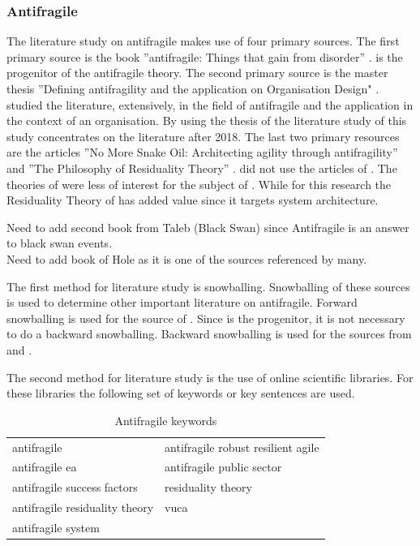 \subsubsection{Antifragile}
\label{subsub:antifragile}
The literature study on \gls{antifragile} makes use of four primary sources. The first primary source is the book ''\Gls{antifragile}: Things that gain from disorder'' \parencite{Taleb2012}. \textcite{Taleb2012} is the progenitor of the \gls{antifragile} theory. The second primary source is the master thesis ''Defining \Gls{antifragility} and the application on Organisation Design" \parencite{Botjes2020}. \citeauthor{Botjes2020} studied the literature, extensively, in the field of \gls{antifragile} and the application in the context of an organisation. By using the thesis of \citeauthor{Botjes2020} the literature study of this study concentrates on the literature after 2018. The last two primary resources are the articles ''No More Snake Oil: Architecting \Gls{agility} through \Gls{antifragility}'' and ''The Philosophy of Residuality Theory'' \parencite{OReilly2019,OReilly2021}. \textcite{Botjes2020} did not use the articles of \citeauthor{OReilly2019}. The theories of \citeauthor{OReilly2019} were less of interest for the subject of \citeauthor{Botjes2020}. While for this research the Residuality Theory of \textcite{OReilly2021} has added value since it targets system architecture.

\begin{remark}
	Need to add second book from Taleb (Black Swan) since Antifragile is an answer to black swan events.\\
	Need to add book of Hole as it is one of the sources referenced by many.
\end{remark}

The first method for literature study is snowballing. Snowballing of these sources is used to determine other important literature on \gls{antifragile}. Forward snowballing is used for the source of \citeauthor{Taleb2012}. Since \citeauthor{Taleb2012} is the progenitor, it is not necessary to do a backward snowballing. Backward snowballing is used for the sources from \citeauthor{Botjes2020} and \citeauthor{OReilly2019}.

The second method for literature study is the use of online scientific libraries. For these libraries the following set of keywords or key sentences are used.
\bigskip

\begin{table}[H]
	\centering
\begin{tabular}{p{}p{}}
	\toprule
	\gls{antifragile}	& \gls{antifragile} \gls{robust} \gls{resilient} \gls{agile}\\%
	\gls{antifragile} \acrlong{ea}	& \gls{antifragile} public sector\\%
	\gls{antifragile} success factors & residuality theory\\%
	\gls{antifragile} residuality theory & \acrlong{vuca} \\%
	\gls{antifragile} system & \\%
	\bottomrule
\end{tabular}
	\caption{Antifragile keywords}
	\label{tab:antifragilekeywords}
\end{table}

